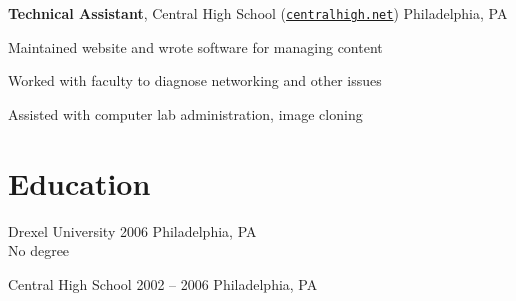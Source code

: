 \documentclass[11pt]{article}
\begin{document}
\begin{description*}
        \textbf{Technical Assistant}, Central High School (\href{http://centralhigh.net}{\texttt{centralhigh.net}}) \hfill Philadelphia, PA
        \begin{itemize*}
            \item Maintained website and wrote software for managing content
            \item Worked with faculty to diagnose networking and other issues
            \item Assisted with computer lab administration, image cloning
        \end{itemize*}
\end{description*}

\section*{Education}
\begin{description*}
    \item[Drexel University] 2006 \hfill Philadelphia, PA \\
        No degree
    \item[Central High School] 2002 -- 2006 \hfill Philadelphia, PA
\end{description*}
\end{document}
